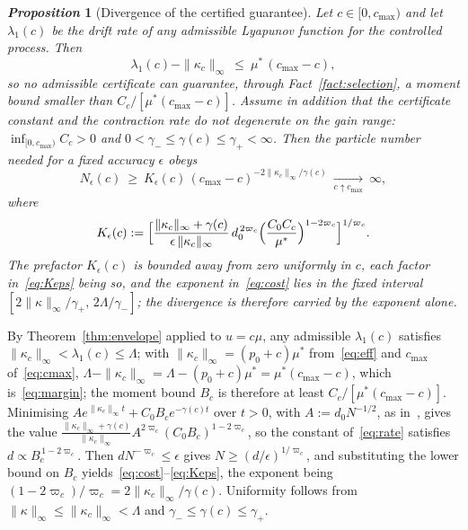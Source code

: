 \documentclass[letterpaper, 10pt, conference]{ieeeconf}
\makeatletter
\newtheorem{proposition}{\it \textbf{Proposition}}
\newcommand{\Lbar}{\Lambda}
\newcommand{\rev}[1]{#1}
\renewenvironment{proof}[1][\proofname]{\par
  \pushQED{\qed}%
  \normalfont\topsep6\p@\@plus6\p@\relax
  \trivlist
  \item[\hskip\labelsep\itshape #1\@addpunct{.}]\ignorespaces
}{%
  \popQED\endtrivlist\@endpefalse
}
\renewenvironment{proof}[1][\proofname]{\par
  \pushQED{\qed}%
  \normalfont\topsep6\p@\@plus6\p@\relax
  \trivlist
  \item[\hskip\labelsep\itshape #1\@addpunct{.}]\ignorespaces
}{%
  \popQED\endtrivlist\@endpefalse
}
\makeatother
\begin{document}
\begin{proposition}[Divergence of the certified guarantee]
\label{prop:cost}
Let $c\in[0,c_{\max})$ and let $\lambda_1(c)$ be the drift rate of any
admissible Lyapunov function for the controlled process. Then
\begin{equation}
\lambda_1(c)-\|\kappa_c\|_\infty\ \le\ \mu^\ast\,(c_{\max}-c),
\label{eq:margin}
\end{equation}
so no admissible certificate can guarantee, through Fact~\ref{fact:selection},
a moment bound smaller than $C_c/[\mu^\ast(c_{\max}-c)]$. \rev{Assume in
addition that the certificate constant and the contraction rate do not
degenerate on the gain range: $\inf_{[0,c_{\max})}C_c>0$ and
$0<\gamma_-\le\gamma(c)\le\gamma_+<\infty$. Then the particle number needed for
a fixed accuracy $\epsilon$ obeys}
\begin{equation}
\rev{N_\epsilon(c)\ \ge\ K_\epsilon(c)\,
(c_{\max}-c)^{-2\|\kappa_c\|_\infty/\gamma(c)}
\ \xrightarrow[c\uparrow c_{\max}]{}\ \infty ,}
\label{eq:cost}
\end{equation}
\rev{where}
\begin{equation}
\rev{K_\epsilon(c):=\Bigl[\frac{\|\kappa_c\|_\infty+\gamma(c)}
{\epsilon\,\|\kappa_c\|_\infty}\,d_0^{\,2\varpi_c}
\Bigl(\frac{C_0C_c}{\mu^\ast}\Bigr)^{1-2\varpi_c}\Bigr]^{1/\varpi_c}.}
\label{eq:Keps}
\end{equation}
\rev{The prefactor $K_\epsilon(c)$ is bounded away from zero uniformly in $c$,
each factor in~\eqref{eq:Keps} being so, and the exponent
in~\eqref{eq:cost} lies in the fixed interval
$[2\|\kappa\|_\infty/\gamma_+,\,2\Lbar/\gamma_-]$; the divergence is therefore
carried by the exponent alone.}
\end{proposition}
\begin{proof}
By Theorem~\ref{thm:envelope} applied to $u=c\mu$, any admissible $\lambda_1(c)$
satisfies $\|\kappa_c\|_\infty<\lambda_1(c)\le\Lbar$; with
$\|\kappa_c\|_\infty=(p_0+c)\mu^\ast$ from~\eqref{eq:eff} and $c_{\max}$
of~\eqref{eq:cmax},
$\Lbar-\|\kappa_c\|_\infty=\Lbar-(p_0+c)\mu^\ast=\mu^\ast(c_{\max}-c)$, which
is~\eqref{eq:margin}; the moment bound $B_c$ is therefore at least
$C_c/[\mu^\ast(c_{\max}-c)]$.
\rev{Minimising $Ae^{\|\kappa_c\|_\infty t}+C_0B_ce^{-\gamma(c)t}$ over $t>0$,
with $A:=d_0N^{-1/2}$, as in~\cite[\S4.3]{cv1}, gives the value
$\frac{\|\kappa_c\|_\infty+\gamma(c)}{\|\kappa_c\|_\infty}
A^{2\varpi_c}(C_0B_c)^{1-2\varpi_c}$, so the constant of~\eqref{eq:rate}
satisfies $d\propto B_c^{\,1-2\varpi_c}$. Then $dN^{-\varpi_c}\le\epsilon$
gives $N\ge(d/\epsilon)^{1/\varpi_c}$, and substituting the lower bound on
$B_c$ yields~\eqref{eq:cost}--\eqref{eq:Keps}, the exponent being
$(1-2\varpi_c)/\varpi_c=2\|\kappa_c\|_\infty/\gamma(c)$. Uniformity follows from
$\|\kappa\|_\infty\le\|\kappa_c\|_\infty<\Lbar$ and
$\gamma_-\le\gamma(c)\le\gamma_+$.}
\end{proof}
\end{document}
